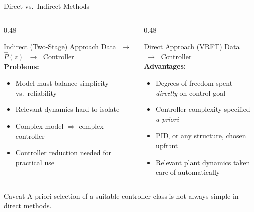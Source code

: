 \documentclass[aspectratio=169]{beamer}
\begin{document}
\begin{frame}{Direct vs.\ Indirect Methods}
  \begin{columns}[T]
    \begin{column}{0.48\textwidth}
      \begin{block}{Indirect (Two-Stage) Approach}
        \centering
        \vspace{0.2em}
        Data $\;\to\;$ $\hat{P}(z)$ $\;\to\;$ Controller\\[0.5em]
        \textbf{Problems:}
        \begin{itemize}
          \item Model must balance simplicity vs.\ reliability
          \item Relevant dynamics hard to isolate
          \item Complex model $\Rightarrow$ complex controller
          \item Controller reduction needed for practical use
        \end{itemize}
      \end{block}
    \end{column}
    \begin{column}{0.48\textwidth}
      \begin{exampleblock}{Direct Approach (VRFT)}
        \centering
        \vspace{0.2em}
        Data $\;\longrightarrow\;$ Controller\\[0.5em]
        \textbf{Advantages:}
        \begin{itemize}
          \item Degrees-of-freedom spent \emph{directly} on control goal
          \item Controller complexity specified \emph{a priori}
          \item PID, or any structure, chosen upfront
          \item Relevant plant dynamics taken care of automatically
        \end{itemize}
      \end{exampleblock}
    \end{column}
  \end{columns}
  \vspace{0.5em}
  \begin{alertblock}{Caveat}
    A-priori selection of a suitable controller class is not always simple in direct methods.
  \end{alertblock}
\end{frame}
\end{document}
